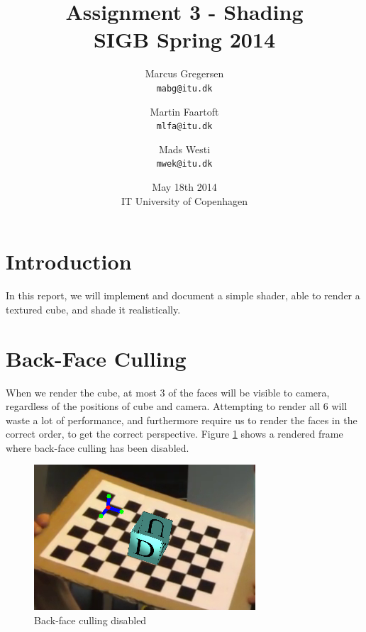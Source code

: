 \documentclass[a4paper,11pt]{article}
\begin{document}
\date{May 18th 2014\\ IT University of Copenhagen}
\title{Assignment 3 - Shading\\SIGB Spring 2014}

\author{Marcus Gregersen\\
\texttt{mabg@itu.dk}
\and Martin Faartoft\\
\texttt{mlfa@itu.dk}
\and Mads Westi\\
\texttt{mwek@itu.dk}}
\clearpage\maketitle
\thispagestyle{empty}
\setcounter{page}{1}
\newpage


\section{Introduction}
In this report, we will implement and document a simple shader, able to render a textured cube, and shade it realistically.

\section{Back-Face Culling}
When we render the cube, at most 3 of the faces will be visible to camera, regardless of the positions of cube and camera. Attempting to render all 6 will waste a lot of performance, and furthermore require us to render the faces in the correct order, to get the correct perspective. Figure \ref{fig:no_culling} shows a rendered frame where back-face culling has been disabled.

\begin{figure}[H]
  \centering
  \includegraphics[width=0.5\linewidth]{no_culling}
  \caption{Back-face culling disabled}
  \label{fig:no_culling}
\end{figure}
\end{document}
